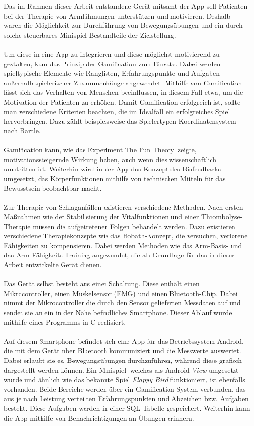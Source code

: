 Das im Rahmen dieser Arbeit entstandene Gerät mitsamt der App soll Patienten bei der Therapie von Armlähmungen unterstützen und motivieren. Deshalb waren die Möglichkeit zur Durchführung von Bewegungsübungen und ein durch solche steuerbares Minispiel Bestandteile der Zielstellung. \\ \\
Um diese in eine App zu integrieren und diese möglichst motivierend zu gestalten, kam das Prinzip der Gamification zum Einsatz. Dabei werden spieltypische Elemente wie Ranglisten, Erfahrungspunkte und Aufgaben außerhalb spielerischer Zusammenhänge angewendet. Mithilfe von Gamification lässt sich das Verhalten von Menschen beeinflussen, in diesem Fall etwa, um die Motivation der Patienten zu erhöhen. Damit Gamification erfolgreich ist, sollte man verschiedene Kriterien beachten, die im Idealfall ein erfolgreiches Spiel hervorbringen. Dazu zählt beispielsweise das Spielertypen-Koordinatensystem nach Bartle. \\ \\
Gamification kann, wie das Experiment \glqq The Fun Theory\grqq ~zeigte, motivationssteigernde Wirkung haben, auch wenn dies wissenschaftlich umstritten ist. Weiterhin wird in der App das Konzept des Biofeedbacks umgesetzt, das Körperfunktionen mithilfe von technischen Mitteln für das Bewusstsein beobachtbar macht. \\ \\
Zur Therapie von Schlaganfällen existieren verschiedene Methoden. Nach ersten Maßnahmen wie der Stabilisierung der Vitalfunktionen und einer Thrombolyse-Therapie müssen die aufgetretenen Folgen behandelt werden. Dazu existieren verschiedene Therapiekonzepte wie das Bobath-Konzept, die versuchen, verlorene Fähigkeiten zu kompensieren. Dabei werden Methoden wie das Arm-Basis- und das Arm-Fähigkeits-Training angewendet, die als Grundlage für das in dieser Arbeit entwickelte Gerät dienen. \\ \\
Das Gerät selbst besteht aus einer Schaltung. Diese enthält einen Mikrocontroller, einen Muskelsensor (EMG) und einen Bluetooth-Chip. Dabei nimmt der Mikrocontroller die durch den Sensor gelieferten Messdaten auf und sendet sie an ein in der Nähe befindliches Smartphone. Dieser Ablauf wurde mithilfe eines Programms in C realisiert.\\ \\
Auf diesem Smartphone befindet sich eine App für das Betriebssystem Android, die mit dem Gerät über Bluetooth kommuniziert und die Messwerte auswertet. Dabei erlaubt sie es, Bewegungsübungen durchzuführen, während diese grafisch dargestellt werden können. Ein Minispiel, welches als Android-\textit{View} umgesetzt wurde und ähnlich wie das bekannte Spiel \textit{Flappy Bird} funktioniert, ist ebenfalls vorhanden. Beide Bereiche werden über ein Gamification-System verbunden, das aus je nach Leistung verteilten Erfahrungspunkten und Abzeichen bzw. Aufgaben besteht. Diese Aufgaben werden in einer SQL-Tabelle gespeichert. Weiterhin kann die App mithilfe von Benachrichtigungen an Übungen erinnern. \\ \\
